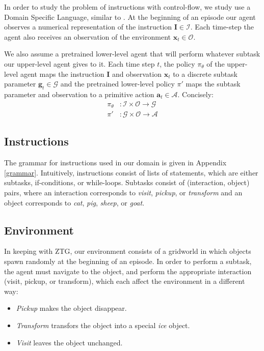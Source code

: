 \documentclass{article}
\begin{document}
In order to study the problem of instructions with control-flow, we
study use a Domain Specific Language, similar to \cite{sun2020program}.
At the beginning of an episode our agent observes a numerical representation of
the instruction $\mathbf{I} \in\mathcal{I}$. Each time-step the agent also receives an observation of the
environment $\mathbf{x}_t \in\mathcal{O}$. 

We also assume a pretrained lower-level agent that will perform whatever subtask our
upper-level agent gives to it. Each time step $t$, the policy $\pi_\theta$ of the upper-level agent
maps the instruction
$\mathbf{I}$ and
observation $\mathbf{x}_t$ to a discrete subtask parameter
$\mathbf{g}_t \in\mathcal{G}$ and the
pretrained lower-level policy $\pi'$ maps the subtask parameter and observation to
a primitive action $\mathbf{a}_t \in \mathcal{A}$. Concisely:
\begin{align}
  \pi_\theta&: \mathcal{I} \times \mathcal{O} \to \mathcal{G} \\
  \pi'&: \mathcal{G} \times \mathcal{O} \to \mathcal{A}
\end{align}

\subsection{Instructions}
The grammar for instructions used in our domain is given in Appendix
\ref{grammar}.
Intuitively, instructions consist of lists of statements, which are either subtasks,
if-conditions, or while-loops. Subtasks consist of (interaction, object) pairs,
where an interaction corresponds to \textit{visit}, \textit{pickup}, or
\textit{transform} and an object corresponds to \textit{cat}, \textit{pig},
\textit{sheep}, or \textit{goat}.

\subsection{Environment}
In keeping with ZTG, our environment consists of a gridworld in which
objects spawn randomly at the beginning of an episode. In order to perform a
subtask, the agent must navigate to the object, and perform the appropriate
interaction (visit, pickup, or transform), which each affect the environment in
a different way:
\begin{itemize}
  \item \textit{Pickup} makes the object disappear. 
  \item \textit{Transform} transfors the object into a special \textit{ice}
    object.
  \item \textit{Visit} leaves the object unchanged.
\end{itemize}
\end{document}
